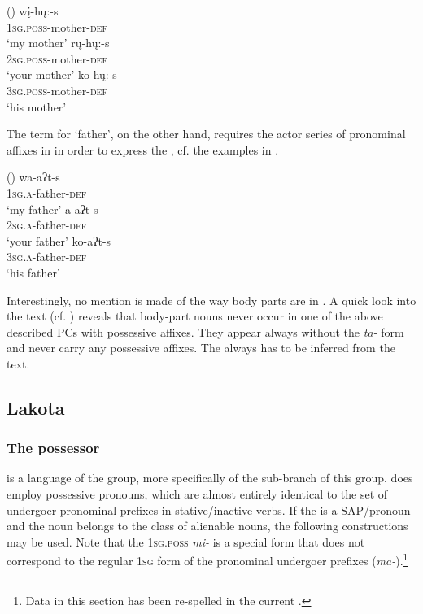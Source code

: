 \documentclass[output=paper]{LSP/langsci}
\begin{document}
\ea {} (\citealt[45]{Mixco1997a}) \label{mandanmother}
\ea
\gll wį-hų:-s \\			
\textsc{1sg.poss}-mother-\textsc{def} \\
\glt `my mother'
\ex \gll rų-hų:-s \\
\textsc{2sg.poss}-mother-\textsc{def} \\
\glt `your mother'
\ex \gll ko-hų:-s \\
\textsc{3sg.poss}-mother-\textsc{def} \\
\glt `his mother'
\z \z

The term for `father', on the other hand, requires the actor series of pronominal affixes in  in order to express the , cf. the examples in .

\newpage 
\ea {} (\citealt[45]{Mixco1997a}) \label{mandanfather}
\ea \gll wa-aʔt-s \\
\textsc{1sg.a}-father-\textsc{def} \\
\glt `my father'
\ex \gll a-aʔt-s \\
\textsc{2sg.a}-father-\textsc{def} \\
\glt `your father'
\ex \gll ko-aʔt-s \\
\textsc{3sg.a}-father-\textsc{def} \\
\glt `his father'
\z \z

Interestingly, no mention is made of the way body parts are  in . A quick look into the  text (cf. \citealt[66ff]{Mixco1997a}) reveals that body-part nouns never occur in one of the above described PCs with possessive affixes. They appear always without the \textit{ta-} form and never carry any possessive affixes. The  always has to be inferred from the text.
 
\subsection{Lakota}\label{sec:helmbrecht:4.4} \label{lakota} 
\subsubsection{The possessor}
 is a language of the  group, more specifically of the  sub-branch of this group.  does employ possessive pronouns, which are almost entirely identical to the set of undergoer pronominal prefixes in stative/inactive verbs. If the  is a SAP/pronoun and the  noun belongs to the class of alienable nouns, the following constructions may be used. Note that the \textsc{1sg.poss} \textit{mi-} is a special form that does not correspond to the regular \textsc{1sg} form of the pronominal undergoer prefixes (\textit{ma-}).\footnote{Data in this section has been re-spelled in the current  .}
\end{document}
